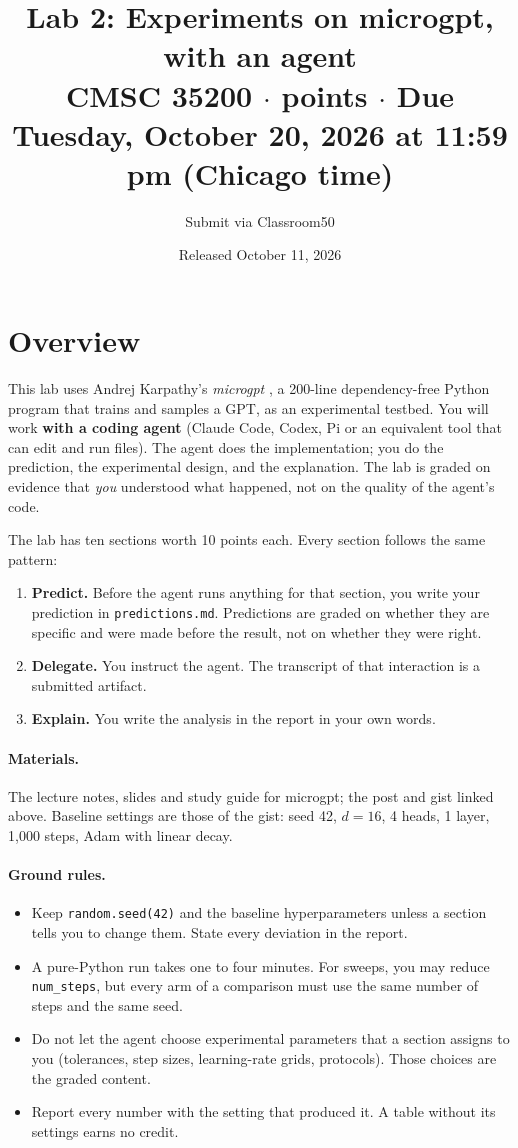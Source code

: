 \documentclass[11pt,letterpaper]{article}
\title{\vspace{-2em}\textbf{Lab 2: Experiments on microgpt, with an agent}\\[0.3em]
\large CMSC 35200 \quad $\cdot$ \quad 100 points \quad $\cdot$ \quad Due Tuesday, October 20, 2026 at 11:59 pm (Chicago time)}
\author{Submit via Classroom50}
\date{Released October 11, 2026}
\begin{document}
\maketitle
\thispagestyle{fancy}

\section*{Overview}

This lab uses Andrej Karpathy's \emph{microgpt} \parencite{karpathy2026microgpt,karpathy2026microgptgist}, a 200-line dependency-free Python program that trains and samples a GPT, as an experimental testbed. You will work \textbf{with a coding agent} (Claude Code, Codex, Pi or an equivalent tool that can edit and run files). The agent does the implementation; you do the prediction, the experimental design, and the explanation. The lab is graded on evidence that \emph{you} understood what happened, not on the quality of the agent's code.

The lab has ten sections worth 10 points each. Every section follows the same pattern:
\begin{enumerate}
  \item \textbf{Predict.} Before the agent runs anything for that section, you write your prediction in \texttt{predictions.md}. Predictions are graded on whether they are specific and were made before the result, not on whether they were right.
  \item \textbf{Delegate.} You instruct the agent. The transcript of that interaction is a submitted artifact.
  \item \textbf{Explain.} You write the analysis in the report in your own words.
\end{enumerate}

\paragraph{Materials.} The lecture notes, slides and study guide for microgpt; the post and gist linked above. Baseline settings are those of the gist: seed 42, $d=16$, 4 heads, 1 layer, 1{,}000 steps, Adam with linear decay.

\paragraph{Ground rules.}
\begin{itemize}
  \item Keep \texttt{random.seed(42)} and the baseline hyperparameters unless a section tells you to change them. State every deviation in the report.
  \item A pure-Python run takes one to four minutes. For sweeps, you may reduce \texttt{num\_steps}, but every arm of a comparison must use the same number of steps and the same seed.
  \item Do not let the agent choose experimental parameters that a section assigns to you (tolerances, step sizes, learning-rate grids, protocols). Those choices are the graded content.
  \item Report every number with the setting that produced it. A table without its settings earns no credit.
\end{itemize}
\end{document}
